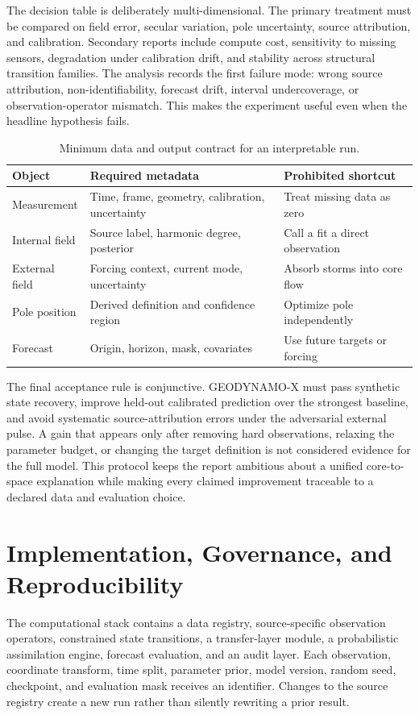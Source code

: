 \documentclass[conference]{IEEEtran}
\begin{document}
The decision table is deliberately multi-dimensional. The primary treatment must be compared on field error, secular variation, pole uncertainty, source attribution, and calibration. Secondary reports include compute cost, sensitivity to missing sensors, degradation under calibration drift, and stability across structural transition families. The analysis records the first failure mode: wrong source attribution, non-identifiability, forecast drift, interval undercoverage, or observation-operator mismatch. This makes the experiment useful even when the headline hypothesis fails.

\begin{table}[t]
\centering
\caption{Minimum data and output contract for an interpretable run.}
\label{tab:contract}
\footnotesize
\begin{tabular}{P{1.7cm}P{2.15cm}P{2.2cm}}
\toprule
Object & Required metadata & Prohibited shortcut \\
\midrule
Measurement & Time, frame, geometry, calibration, uncertainty & Treat missing data as zero \\
Internal field & Source label, harmonic degree, posterior & Call a fit a direct observation \\
External field & Forcing context, current mode, uncertainty & Absorb storms into core flow \\
Pole position & Derived definition and confidence region & Optimize pole independently \\
Forecast & Origin, horizon, mask, covariates & Use future targets or forcing \\
\bottomrule
\end{tabular}
\end{table}

The final acceptance rule is conjunctive. GEODYNAMO-X must pass synthetic state recovery, improve held-out calibrated prediction over the strongest baseline, and avoid systematic source-attribution errors under the adversarial external pulse. A gain that appears only after removing hard observations, relaxing the parameter budget, or changing the target definition is not considered evidence for the full model. This protocol keeps the report ambitious about a unified core-to-space explanation while making every claimed improvement traceable to a declared data and evaluation choice.

\section{Implementation, Governance, and Reproducibility}
The computational stack contains a data registry, source-specific observation operators, constrained state transitions, a transfer-layer module, a probabilistic assimilation engine, forecast evaluation, and an audit layer. Each observation, coordinate transform, time split, parameter prior, model version, random seed, checkpoint, and evaluation mask receives an identifier. Changes to the source registry create a new run rather than silently rewriting a prior result.
\end{document}
